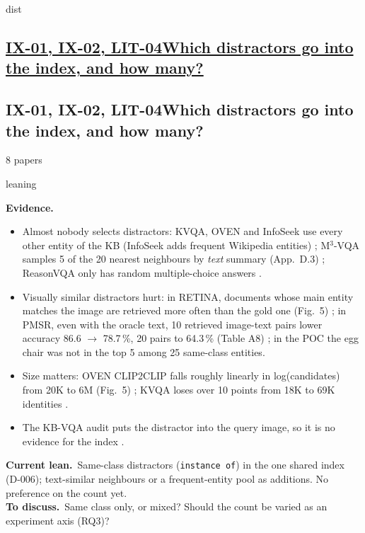 \documentclass[10pt,a4paper]{article}
\newcommand{\st}[2]{\colorbox{#1}{\footnotesize\strut #2}}
\newcommand{\leaning}{\st{yellow!35}{leaning}}
\newcommand{\qblock}[1][]{\def\qkey{#1}\qblockx}
\newcommand{\qblockx}[4]{%
  \ifx\qkey\empty
  \subsection*{\underline{#1\quad #2}}%
  \else\hypertarget{\qkey}{}
  \subsection*{#1\quad #2}\fi%
{\footnotesize #3 papers\quad}#4\par}
\newcommand{\ev}{\textbf{Evidence.}}
\newcommand{\lean}{\textbf{Current lean.}}
\newcommand{\ask}{\textbf{To discuss.}}
\begin{document}
\qblock[dist]{IX-01, IX-02, LIT-04}{Which distractors go into the index,
and how many?}{8}{\leaning}
\ev
\begin{itemize}
  \item Almost nobody selects distractors: KVQA, OVEN and InfoSeek use
    every other entity of the KB (InfoSeek adds frequent Wikipedia entities)
    \cite{shah2019kvqa,hu2023open,chen2023can}; M$^3$-VQA samples 5 of the
    20 nearest neighbours by \emph{text} summary (App.~D.3) \cite{ma2026m3};
    ReasonVQA only has random multiple-choice answers \cite{tran2025reasonvqa}.
  \item Visually similar distractors hurt: in RETINA, documents whose
    main entity matches
    the image are retrieved more often than the gold one (Fig.~5)
    \cite{lee2025breaking}; in PMSR, even with the oracle text, 10 retrieved
    image-text pairs lower accuracy 86.6 $\to$ 78.7\,\%, 20 pairs to
    64.3\,\% (Table A8) \cite{choi2025progressive}; in the POC the egg chair
    was not in the top 5 among 25 same-class entities.
  \item Size matters: OVEN CLIP2CLIP falls roughly linearly in log(candidates)
    from 20K to 6M (Fig.~5) \cite{hu2023open}; KVQA loses over 10 points from
    18K to 69K identities \cite{shah2019kvqa}.
  \item The KB-VQA audit puts the distractor into the query image, so it is no
    evidence for the index \cite{ma2026identifying}.
\end{itemize}
\lean\ Same-class distractors (\texttt{instance of}) in the one shared
index (D-006); text-similar neighbours or a frequent-entity pool as
additions. No preference on the count yet.\\
\ask\ Same class only, or mixed? Should the count be varied as an
experiment axis (RQ3)?
\end{document}
